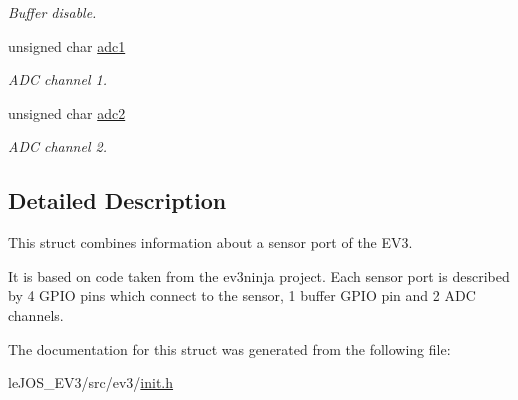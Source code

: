 \begin{DoxyCompactItemize}
\begin{DoxyCompactList}\small\item\em Buffer disable. \end{DoxyCompactList}\item 
\hypertarget{structsensor__port__info_a8026555c6f721c2471a314e343cf4f0b}{}unsigned char \hyperlink{structsensor__port__info_a8026555c6f721c2471a314e343cf4f0b}{adc1}\label{structsensor__port__info_a8026555c6f721c2471a314e343cf4f0b}

\begin{DoxyCompactList}\small\item\em A\+D\+C channel 1. \end{DoxyCompactList}\item 
\hypertarget{structsensor__port__info_a088382fdcfe1201d13b924a848e4f126}{}unsigned char \hyperlink{structsensor__port__info_a088382fdcfe1201d13b924a848e4f126}{adc2}\label{structsensor__port__info_a088382fdcfe1201d13b924a848e4f126}

\begin{DoxyCompactList}\small\item\em A\+D\+C channel 2. \end{DoxyCompactList}\end{DoxyCompactItemize}


\subsection{Detailed Description}
This struct combines information about a sensor port of the E\+V3. 

It is based on code taken from the ev3ninja project. Each sensor port is described by 4 G\+P\+I\+O pins which connect to the sensor, 1 buffer G\+P\+I\+O pin and 2 A\+D\+C channels. 

The documentation for this struct was generated from the following file\+:\begin{DoxyCompactItemize}
\item 
le\+J\+O\+S\+\_\+\+E\+V3/src/ev3/\hyperlink{init_8h}{init.\+h}\end{DoxyCompactItemize}
